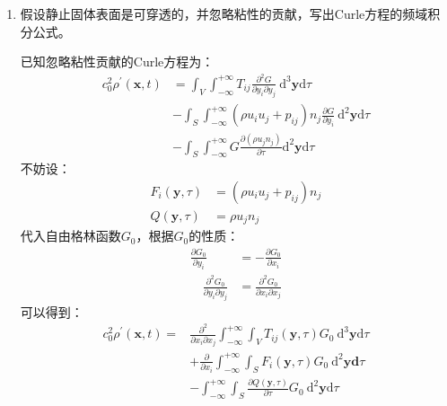 \begin{enumerate}
    \clearpage

    \item 假设静止固体表面是可穿透的，并忽略粘性的贡献，写出Curle方程的频域积分公式。

        已知忽略粘性贡献的Curle方程为：
        \begin{equation}
            \begin{aligned}
                c_{0}^{2} \rho^{\prime}(\mathbf{x}, t) 
                &=\int_{V} \int_{-\infty}^{+\infty} T_{i j} \frac{\partial^{2} G}{\partial y_{i} \partial y_{j}} \mathrm{~d}^{3} \mathbf{y} \mathrm{d} \tau \\
                &-\int_{S} \int_{-\infty}^{+\infty}\left(\rho u_{i} u_{j}+p_{i j}\right) n_{j} \frac{\partial G}{\partial y_{i}} \mathrm{~d}^{2} \mathbf{y} \mathrm{d} \tau \\
                &-\int_{S} \int_{-\infty}^{+\infty} G \frac{\partial\left(\rho u_{j} n_{j}\right)}{\partial \tau} \mathrm{d}^{2} \mathbf{y} \mathrm{d} \tau
            \end{aligned}
        \end{equation}
        不妨设：
        \begin{align}
            F_{i}(\mathbf{y}, \tau)
            &=\left(\rho u_{i} u_{j}+p_{i j}\right) n_{j} \\
            Q(\mathbf{y}, \tau)
            &=\rho u_{j} n_{j}
        \end{align}
        代入自由格林函数$G_{0}$，根据$G_{0}$的性质：
        \begin{align}
            \frac{\partial G_{0}}{\partial y_{i}}
            &= -\frac{\partial G_{0}}{\partial x_{i}} \\
            \quad \frac{\partial^{2} G_{0}}{\partial y_{i} \partial y_{j}}
            &= \frac{\partial^{2} G_{0}}{\partial x_{i} \partial x_{j}}
        \end{align}
        可以得到：
        \begin{equation}
            \begin{aligned}
                c_{0}^{2} \rho^{\prime}(\mathbf{x}, t) 
                =&\frac{\partial^{2}}{\partial x_{i} \partial x_{j}} \int_{-\infty}^{+\infty} \int_{V} T_{i j}(\mathbf{y}, \tau) G_{0} \mathrm{~d}^{3} \mathbf{y} \mathrm{d} \tau \\
                &+\frac{\partial}{\partial x_{i}} \int_{-\infty}^{+\infty} \int_{S} F_{i}(\mathbf{y}, \tau) G_{0} \mathrm{~d}^{2} \mathbf{y d} \tau \\
                &-\int_{-\infty}^{+\infty} \int_{S} \frac{\partial Q(\mathbf{y}, \tau)}{\partial \tau} G_{0} \mathrm{~d}^{2} \mathbf{y} \mathrm{d} \tau \\

\end{aligned}
\end{equation}
\end{enumerate}
